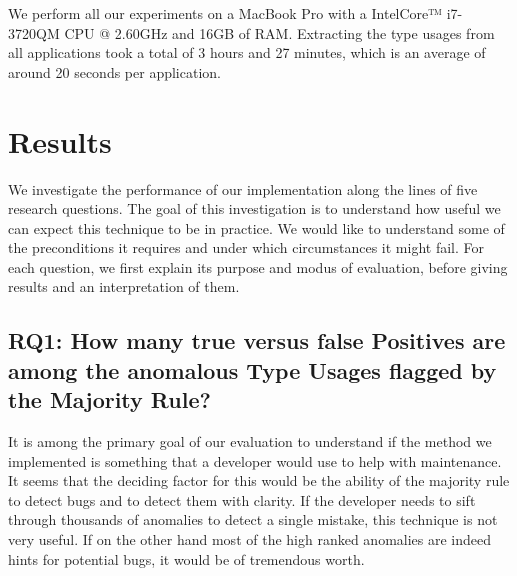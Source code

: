 We perform all our experiments on a MacBook Pro with a Intel\textregistered Core™ i7-3720QM CPU @ 2.60GHz and 16GB of RAM.
Extracting the type usages from all applications took a total of 3 hours and 27 minutes, which is an average of around 20 seconds per application.


\section{Results}


We investigate the performance of our implementation along the lines of five research questions.
The goal of this investigation is to understand how useful we can expect this technique to be in practice.
We would like to understand some of the preconditions it requires and under which circumstances it might fail.
For each question, we first explain its purpose and modus of evaluation, before giving results and an interpretation of them.

\subsection{RQ1: How many true versus false Positives are among the anomalous Type Usages flagged by the Majority Rule?}

It is among the primary goal of our evaluation to understand if the method we implemented is something that a developer would use to help with maintenance.
It seems that the deciding factor for this would be the ability of the majority rule to detect bugs and to detect them with clarity.
If the developer needs to sift through thousands of anomalies to detect a single mistake, this technique is not very useful.
If on the other hand most of the high ranked anomalies are indeed hints for potential bugs, it would be of tremendous worth.

